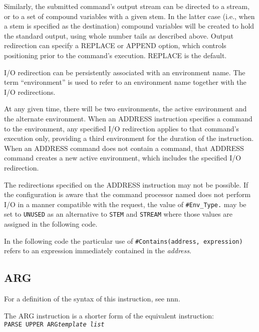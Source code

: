 Similarly, the submitted command's output stream can be directed to a
stream, or to a set of compound variables with a given stem. In the
latter case (i.e., when a stem is specified as the destination) compound
variables will be created to hold the standard output, using whole
number tails as described above. Output redirection can specify a
REPLACE or APPEND option, which controls positioning prior to the
command's execution. REPLACE is the default.

I/O redirection can be persistently associated with an environment name.
The term ``environment'' is used to refer to an environment name
together with the I/O redirections.

At any given time, there will be two environments, the active
environment and the alternate environment. When an ADDRESS instruction
specifies a command to the environment, any specified I/O redirection
applies to that command's execution only, providing a third environment
for the duration of the instruction. When an ADDRESS command does not
contain a command, that ADDRESS command creates a new active
environment, which includes the specified I/O redirection.

The redirections specified on the ADDRESS instruction may not be
possible. If the configuration is aware that the command processor named
does not perform I/O in a manner compatible with the request, the value
of \texttt{\#Env\_Type.} may be set to
\texttt{\textquotesingle{}UNUSED\textquotesingle{}} as an alternative to
\texttt{\textquotesingle{}STEM\textquotesingle{}} and
\texttt{\textquotesingle{}STREAM\textquotesingle{}} where those values
are assigned in the following code.

In the following code the particular use of
\texttt{\#Contains(address,\ expression)} refers to an expression
immediately contained in the \emph{address}.



\subsection{ARG}\label{arg}

For a definition of the syntax of this instruction, see nnn.

The ARG instruction is a shorter form of the equivalent instruction:\\
\texttt{PARSE\ UPPER\ ARG}\emph{\texttt{template\ list}}

